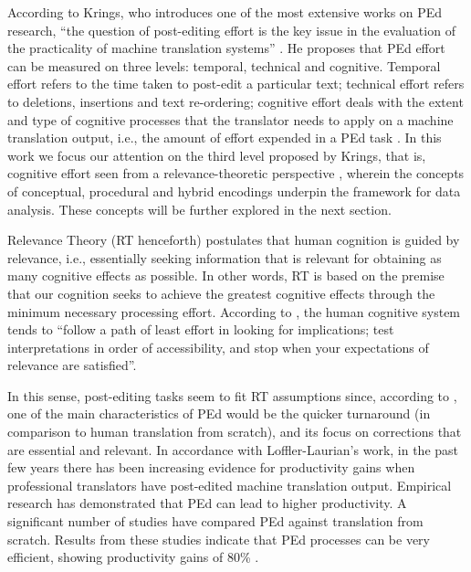 \documentclass[output=paper]{langsci/langscibook}
\begin{document}
According to Krings, who introduces one of the most extensive works on PEd research, “the question of post-editing effort is the key issue in the evaluation of the practicality of machine translation systems” \citep[p. 178]{krings2001}. He proposes that PEd effort can be measured on three levels: temporal, technical and cognitive. Temporal effort refers to the time taken to post-edit a particular text; technical effort refers to deletions, insertions and text re-ordering; cognitive effort deals with the extent and type of cognitive processes that the translator needs to apply on a machine translation output, i.e., the amount of effort expended in a PEd task \citep{obrien2006}. In this work we focus our attention on the third level proposed by Krings, that is, cognitive effort seen from a relevance-theoretic perspective \citep{Sperber1986second}, wherein the concepts of conceptual, procedural and hybrid encodings underpin the framework for data analysis. These concepts will be further explored in the next section.



Relevance Theory (RT henceforth) postulates that human cognition is guided by relevance, i.e., essentially seeking information that is relevant for obtaining as many cognitive effects as possible. In other words, RT is based on the premise that our cognition seeks to achieve the greatest cognitive effects through the minimum necessary processing effort. According to \citet[p. 72]{Wilson2011}, the human cognitive system tends to “follow a path of least effort in looking for implications; test interpretations in order of accessibility, and stop when your expectations of relevance are satisfied”. 



In this sense, post-editing tasks seem to fit RT assumptions since, according to \citet{LofflerLaurian1984, LofflerLaurian1996}, one of the main characteristics of PEd would be the quicker turnaround (in comparison to human translation from scratch), and its focus on corrections that are essential and relevant. In accordance with Loffler-Laurian’s work, in the past few years there has been increasing evidence for productivity gains when professional translators have post-edited machine translation output. Empirical research has demonstrated that PEd can lead to higher productivity. A significant number of studies have compared PEd against translation from scratch. Results from these studies indicate that PEd processes can be very efficient, showing productivity gains of 80\% \citep{Plitt2010, skadicnvs2011, pouliquen2011, federico2012}. 
\end{document}
